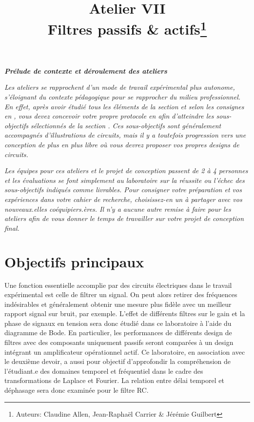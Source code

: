 \documentclass[canadien,12pt,oneside,letterpaper]{article}
\title{\textbf{Atelier VII}\\Filtres passifs \& actifs\thanks{Auteurs: Claudine Allen, Jean-Raphaël Carrier \& Jérémie Guilbert}}
\date{}
\begin{document}
\maketitle \vspace{-2cm}

\noindent\textit{\textbf{Prélude de contexte et déroulement des ateliers}}

\textit{Les ateliers se rapprochent d'un mode de travail expérimental plus autonome, s'éloignant du contexte pédagogique pour se rapprocher du milieu professionnel. En effet, après avoir étudié tous les éléments de la section  et selon les consignes en , vous devez concevoir votre propre protocole en  afin d'atteindre les sous-objectifs sélectionnés de la section . Ces sous-objectifs sont généralement accompagnés d'illustrations de circuits, mais il y a toutefois progression vers une conception de plus en plus libre où vous devrez proposer vos propres designs de circuits.}

\textit{Les équipes pour ces ateliers et le projet de conception passent de 2 à 4 personnes et les évaluations se font simplement au laboratoire sur la réussite ou l'échec des sous-objectifs indiqués comme livrables. Pour consigner votre préparation et vos expériences dans votre cahier de recherche, choisissez-en un à partager avec vos nouveaux.elles coéquipiers.ères. Il n'y a aucune autre remise à faire pour les ateliers afin de vous donner le temps de travailler sur votre projet de conception final.}

\vspace{-2.5ex}
\section{Objectifs principaux}\label{sec:objectifs}
\vspace{-1.5ex}
Une fonction essentielle accomplie par des circuits électriques dans le travail expérimental est celle de filtrer un signal. On peut alors retirer des fréquences indésirables et généralement obtenir une mesure plus fidèle avec un meilleur rapport signal sur bruit, par exemple. L’effet de différents filtres sur le gain et la phase de signaux en tension sera donc étudié dans ce laboratoire à l’aide du diagramme de Bode. En particulier, les performances de différents design de filtres avec des composants uniquement passifs seront comparées à un design intégrant un amplificateur opérationnel actif. Ce laboratoire, en association avec le deuxième devoir, a aussi pour objectif d’approfondir la compréhension de l’étudiant.e des domaines temporel et fréquentiel dans le cadre des transformations de Laplace et Fourier. La relation entre délai temporel et déphasage sera donc examinée pour le filtre RC.\\
\end{document}
